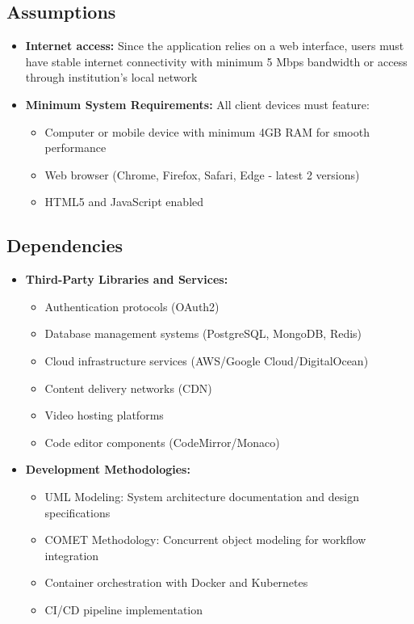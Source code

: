 \documentclass[a4paper, 11pt]{scrreprt}
\begin{document}
\subsection{Assumptions}
\begin{itemize}
    \item \textbf{Internet access:} Since the application relies on a web interface, users must have stable internet connectivity with minimum 5 Mbps bandwidth or access through institution's local network
    
    \item \textbf{Minimum System Requirements:} All client devices must feature:
        \begin{itemize}
            \item Computer or mobile device with minimum 4GB RAM for smooth performance
            \item Web browser (Chrome, Firefox, Safari, Edge - latest 2 versions)
            \item HTML5 and JavaScript enabled
        \end{itemize}
\end{itemize}

\subsection{Dependencies}
\begin{itemize}
    \item \textbf{Third-Party Libraries and Services:}
        \begin{itemize}
            \item Authentication protocols (OAuth2)
            \item Database management systems (PostgreSQL, MongoDB, Redis)
            \item Cloud infrastructure services (AWS/Google Cloud/DigitalOcean)
            \item Content delivery networks (CDN)
            \item Video hosting platforms
            \item Code editor components (CodeMirror/Monaco)
        \end{itemize}
    
    \item \textbf{Development Methodologies:}
        \begin{itemize}
            \item UML Modeling: System architecture documentation and design specifications
            \item COMET Methodology: Concurrent object modeling for workflow integration
            \item Container orchestration with Docker and Kubernetes
            \item CI/CD pipeline implementation
        \end{itemize}
\end{itemize}
\end{document}
